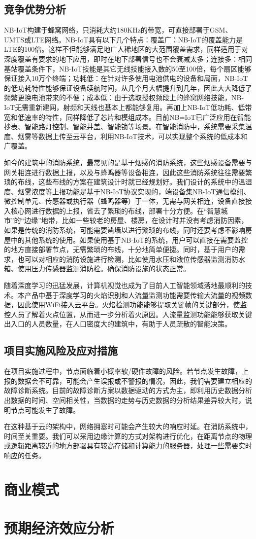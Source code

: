 \documentclass{ctexart}
\begin{document}
	\subsection{竞争优势分析}
	NB-IoT构建于蜂窝网络，只消耗大约180KHz的带宽，可直接部署于GSM、UMTS或LTE网络。NB-IoT具有以下几个特点：覆盖广：NB-IoT的覆盖能力是LTE的100倍。这样不但能够满足地广人稀地区的大范围覆盖需求，同样适用于对深度覆盖有要求的地下应用，即时在地下部署信号也不会衰减太多；连接多：相同基站覆盖条件下，NB-IoT技能是其它无线技能接入数的50至100倍，每个扇区能够保证接入10万个终端；功耗低：在针对许多使用电池供电的设备和局面，NB-IoT的低功耗特性能够保证设备续航时间，从几个月大幅提升到几年，因此大大降低了频繁更换电池带来的不便；成本低：由于选取授权频段上的蜂窝网络技能，NB-IoT无需重新建网，射频和天线也基本上都能够复用。再加上NB-IoT低功耗、低带宽和低速率的特性，同样降低了芯片和模组成本。目前NB=IoT已广泛应用在智能抄表、智能路灯控制、智能井盖、智能锁等场景。在智能消防中，系统需要采集温度、烟雾等数据上传至云平台，利用NB-IoT技术，可以实现整个系统的低成本和广覆盖。\par
	如今的建筑中的消防系统，最常见的是基于烟感的消防系统，这些烟感设备需要与网关相连进行数据上报，以及与蜂鸣器等设备相连，因此这些消防系统往往需要繁琐的布线，这些布线的方案在建筑设计时就已经规划好。我们设计的系统中的温湿度、烟雾浓度等上报功能是基于NB-IoT协议实现的，端设备集NB-IoT通信模组、微控制单元、传感器或执行器（蜂鸣器等）于一体，无需与网关相连，设备直接接入核心网进行数据的上报，省去了繁琐的布线，部署十分方便。在“智慧城市”的“边缘”地带，比如一些较老的房屋、楼房，在设计时并没有考虑消防因素，如果是传统的消防系统，可能需要凿墙以进行繁琐的布线，同时还要考虑不影响房屋中的其他系统的使用。如果使用基于NB-IoT的系统，用户可以直接在需要监控的地方直接部署节点，无需繁琐的布线，十分地简单便捷。同时，基于用户的需求，也可以对相应的消防设施进行检测，比如使用水压和液位传感器监测消防水箱、使用压力传感器监测消防栓。确保消防设施的状态正常。\par
	随着深度学习的迅猛发展，计算机视觉也成为了目前人工智能领域落地最顺利的技术。本产品中基于深度学习的火焰识别和人流量监测功能需要传输大流量的视频数据，因此使用WiFi接入云平台。火焰检测功能能够提取关键帧的关键部分，使监控人员了解着火点位置，从而进一步分析着火原因。人流量监测功能能够获取关键出入口的人员数量，在人口密度大的建筑中，有助于人员疏散的智能决策。
	\subsection{项目实施风险及应对措施}
	在项目实施过程中，节点面临着小概率软/硬件故障的风险。若节点发生故障，上报的数据会不可靠，可能会产生误报或不警报的情况，因此，我们需要建立相应的故障诊断系统。目前的故障诊断方案以数据驱动的方式为主，即利用历史数据分析出数据的时间、空间相关性，当数据的走势与历史数据的分析结果差异较大时，说明节点可能发生了故障。\par
	在这种基于云的架构中，网络拥塞时可能会产生较大的响应时延。在消防系统中，时间至关重要。我们可以采用边缘计算的方式对架构进行优化，在距离节点的物理或逻辑距离较近的地方部署具有较高存储和计算能力的服务器，处理一些需要实时响应的任务。
	\section{商业模式}
	\section{预期经济效应分析}
	
	
	
	
	
\end{document}

